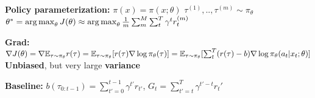 \textbf{Policy parameterization:} $\pi(x) = \pi(x;\theta)$ $\tau^{(1)},..,\tau^{(m)} \sim \pi_\theta$\\
$\theta^* = \operatorname*{arg\,max}_\theta J(\theta) 
\approx \operatorname*{arg\,max}_\theta \frac{1}{m} \sum^M_m \sum^T_t \gamma^t r_t^{(m)}$\\
\begin{comment}
	We focus on episodic tasks here, reset the agent after some iterations or terminal after T timesteps. This generates trajectories depending on policy $\pi$. 
	By Monte Carlo sampling we can globally optimize over the future discounted rewards.\\
	A trajectory is of form $\tau^{(i)} = (x_0^{(i)}, a_0^{(i)}, r_0^{(i)}, x_1^{(i)}, a_1^{(i)}, r_1^{(i)},...)$\\
\end{comment}

\textbf{Grad:} $\nabla J(\theta) = \nabla\mathbb{E}_{\tau \sim \pi_\theta} r(\tau) 
= \mathbb{E}_{\tau \sim \pi_\theta}[r(\tau) \nabla \log \pi_\theta(\tau)]\\
= \mathbb{E}_{\tau \sim \pi_\theta}[\sum_t^T (r(\tau)-b) \nabla \log \pi_\theta(a_t|x_t; \theta)]$\\
\textbf{Unbiased}, but very large \textbf{variance}\\ 
\begin{comment}
	This means that we try to increase the probability of trajectories with high returns and decrease the probability of trajectories with low returns\\
	From the MDP, we have $\pi_\theta(\tau) = p(x_0) \prod_t^T \pi(a_t|x_t; \theta) p(x_{t+1}|x_t, a_t)$, thus $\nabla \log \pi_\theta(\tau) = \sum_t^T \nabla \log \pi(a_t| x_t; \theta)$\\
	The large variance can be fought off by subtracting a baseline.\\
\end{comment}

\textbf{Baseline:} $b(\tau_{0:t-1}) = \sum_{t'=0}^{t-1} \gamma^{t'}r_{t'}$, $G_t = \sum_{t' = t}^T \gamma^{t'-t} r_t'$\\
\begin{comment}
	One could use different baselines, like constants or the mean\\
\end{comment}

